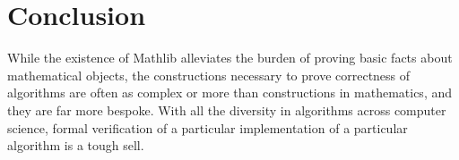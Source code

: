 \documentclass{article}
\begin{document}








\section{Conclusion}
While the existence of Mathlib alleviates the burden of proving basic facts about mathematical objects, the constructions necessary to prove correctness of algorithms are often as complex or more than constructions in mathematics, and they are far more bespoke.
With all the diversity in algorithms across computer science, formal verification of a particular implementation of a particular algorithm is a tough sell.
\end{document}
